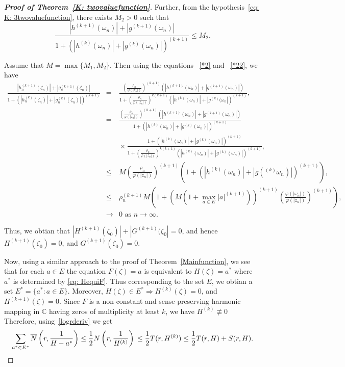 \documentclass[10pt,a4paper]{amsart}
\numberwithin{equation}{section}
\begin{document}
\begin{proof}[\bf{Proof of Theorem~\ref{K: twovaluefunction}}]
Further, from the hypothesis~\eqref{eq: K: 3twovaluefunction},
there exists $M_2>0$ such that
\begin{equation}\label{*22}
  \frac{|h^{(k+1)}(\omega_n)|+|g^{(k+1)}(\omega_n)|}
  {1+(|h^{(k)}(\omega_n)|+|g^{(k)}(\omega_n)|)^{(k+1)}}\leq M_2.
\end{equation}

Assume that $M=\max\{M_1, M_2\}$. Then using the equations ~\eqref{*2} 
and ~\eqref{*22}, we have
\begin{eqnarray*}
  \frac{|h_n^{(k+1)}(\zeta_n)|+|g_n^{(k+1)}(\zeta_n)|}
  {1+(|h_n^{(k)}(\zeta_n)|+|g_n^{(k)}(\zeta_n)|)^{(k+1)}} 
  &=& \frac{\left(\frac{\rho_n}{\varphi(|z_n|)}
  \right)^{(k+1)}\left(|h^{(k+1)}(\omega_n)|
  +|g^{(k+1)}(\omega_n)|\right)}{1+\left(\frac{\rho_n}
  {\varphi(|z_n|)}\right)^{k(k+1)}\left(|h^{(k)}(\omega_n)|+
  |g^{(k)}(\omega_n|\right)^{(k+1)}}, \\
  &=& \frac{\left(\frac{\rho_n}{\varphi(|z_n|)}\right)^{(k+1)}
  \left(|h^{(k+1)}(\omega_n)|+|g^{(k+1)}(\omega_n)|\right)}
  {1+\left(|h^{(k)}(\omega_n)|+|g^{(k)}(\omega_n)|\right)^{(k+1)}}\\ 
  &&\!\times\!
  \frac{1+\left(|h^{(k)}(\omega_n)|+|g^{(k)}(\omega_n)|\right)^{(k+1)}}
  {1+\left(\frac{\rho_n}{\varphi(|z_n|)}\right)^{k(k+1)}
  \left(|h^{(k)}(\omega_n)|+|g^{(k)}(\omega_n)|\right)^{(k+1)}}, \\
   &\leq& M \left(\frac{\rho_n}{\varphi(|z_n|)}\right)^{(k+1)}
   \left(1+\left(|h^{(k)}(\omega_n)|+|g(^{(k)}\omega_n)|\right)^{(k+1)}\right),\\
  &\leq& \rho_n^{(k+1)} M \left(1+(M(1+\max_{a\in E}
  |a|^{(k+1)}))^{(k+1)}\left(\frac{\varphi(|\omega_n|)}
  {\varphi(|z_n|)}\right)^{(k+1)}\right),
   \\
  &\to & 0 \,\, \text{as}\,\, n \to \infty.
\end{eqnarray*}

Thus, we obtian that $|H^{(k+1)}(\zeta_0)|+|G^{(k+1)}(\zeta_0|=0$, and
 hence $H^{(k+1)}(\zeta_0)=0$, and 
 $G^{(k+1)}(\zeta_0)=0$.\smallskip
 
Now, using a similar approach to the proof of Theorem~\ref{Mainfunction}, we see that 
for each $a\in E$ the equation $F(\zeta)=a$ is equivalent to $H(\zeta)=a^*$ where $a^*$
 is determined by \eqref{eq: HequiF}.  Thus  
 corresponding to the set $E$, we obtian a set $E^*=\{a^*: a\in E\}$. Moreover,
 $H(\zeta)\in E^*\Longrightarrow H^{(k)}(\zeta)=0$, and 
 $H^{(k+1)}(\zeta)=0$. Since $F$ 
is a non-constant and sense-preserving harmonic mapping in
 $\mathbb{C}$ having zeros of multiplicity at least
$k$, we have $H^{(k)}\not\equiv 0$
 Therefore, using~\eqref{logrderiv} we get
 \[
\sum_{a^* \in E^*}\overline{N}\left(r, \frac{1}{H-a^*}\right)\leq
\frac{1}{2}N\left(r,\frac{1}{H^{(k)}}\right)\\ \leq \frac{1}{2} 
T(r,H^{(k)})\leq \frac{1}{2} T(r,H)+S(r,H).\]


\end{proof}
\end{document}
